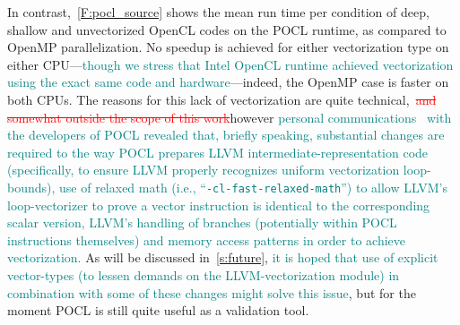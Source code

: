 \documentclass[12pt,number,sort&compress,preprint]{elsarticle}
\newcommand{\add}[1]{{\sloppy\textcolor{teal}{#1}}}  %
\newcommand{\delete}[1]{\sloppy\textcolor{red}{\sout{#1}}} %
\begin{document}
In contrast,~\cref{F:pocl_source} shows the mean run time per condition of deep, shallow and unvectorized OpenCL codes on the POCL runtime, as compared to OpenMP parallelization.
No speedup is achieved for either vectorization type on either CPU---\add{though we stress that Intel OpenCL runtime achieved vectorization using the exact same code and hardware}---indeed, the OpenMP case is faster on both CPUs.
The reasons for this lack of vectorization are quite technical,~\delete{and somewhat outside the scope of this work}however \add{personal communications~\cite{pocl_communication} with the developers of POCL revealed that, briefly speaking, substantial changes are required to the way POCL prepares LLVM intermediate-representation code (specifically, to ensure LLVM properly recognizes uniform vectorization loop-bounds), use of relaxed math (i.e., ``\texttt{-cl-fast-relaxed-math}'') to allow LLVM's loop-vectorizer to prove a vector instruction is identical to the corresponding scalar version, LLVM's handling of branches (potentially within POCL instructions themselves) and memory access patterns in order to achieve vectorization.}
As will be discussed in~\cref{s:future}, \add{it is hoped that use of explicit vector-types (to lessen demands on the LLVM-vectorization module) in combination with some of these changes might solve this issue}, but for the moment POCL is still quite useful as a validation tool.
\end{document}
